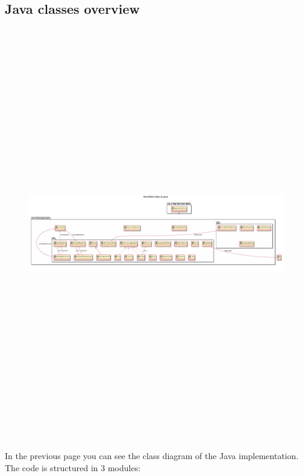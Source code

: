 \documentclass[11pt]{article}
\begin{document}
\subsection{Java classes overview}
\begin{figure}
	\vspace{-2cm}
	\hspace{-1cm}
	\includegraphics[height=18cm,angle=90]{figs/backend.pdf}
\end{figure}

In the previous page you can see the class diagram of the Java implementation.
The code is structured in 3 modules: 
\end{document}
